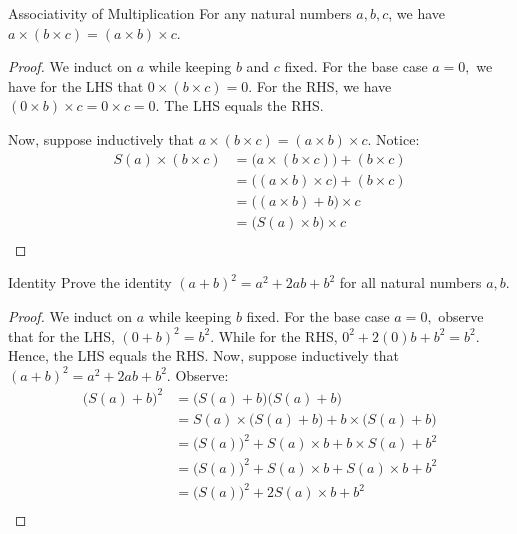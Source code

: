 \begin{problem}{Associativity of Multiplication}
    For any natural numbers $a, b, c$, we have $a \times (b \times c) = (a \times b) \times c.$
\end{problem}
\begin{proof}
    We induct on $a$ while keeping $b$ and $c$ fixed. 
    For the base case $a = 0,$ we have for the LHS that $0 \times (b \times c) = 0.$ 
    For the RHS, we have $(0 \times b) \times c = 0 \times c = 0.$ 
    The LHS equals the RHS.

    Now, suppose inductively that $a \times (b \times c) = (a \times b) \times c.$ Notice:
    \begin{align*}
        S(a) \times (b \times c) &= \big(a \times (b \times c)\big) + (b \times c) \\
        &= \big((a \times b) \times c\big) + (b \times c) \\
        &= \big((a \times b) + b\big) \times c \\
        &= \big(S(a) \times b \big) \times c \\
    \end{align*}

\end{proof}

\begin{problem}{Identity}
    Prove the identity $(a + b)^2 = a^2 + 2ab + b^2$ for all natural numbers $a, b$.
\end{problem}
\begin{proof}
    We induct on $a$ while keeping $b$ fixed. 
    For the base case $a = 0,$ observe that for the LHS, $(0 + b)^2 = b^2.$
    While for the RHS, $0^2 + 2 (0) b + b^2 = b^2$. Hence, the LHS equals the RHS.
    Now, suppose inductively that $(a + b)^2 = a^2 + 2ab + b^2$. Observe:
    \begin{align*}
        \big(S(a) + b \big)^2 &= \big(S(a) + b \big) \big(S(a) + b \big) \\
        &= S(a) \times \big(S(a) + b \big) + b \times \big(S(a) + b \big) \\
        &= \big(S(a)\big)^2 + S(a) \times b + b \times S(a) + b^2 \\
        &= \big(S(a)\big)^2 + S(a) \times b + S(a) \times b + b^2 \\
        &= \big(S(a)\big)^2 + 2S(a) \times b  + b^2 \\
    \end{align*}
\end{proof}

